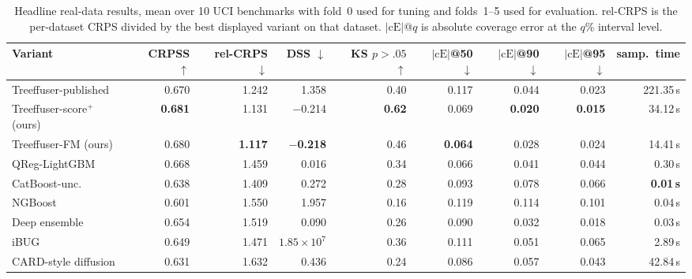 \documentclass{tpm2026}
\begin{document}
\begin{table}[!t]
  \centering
  \caption{Headline real-data results, mean over 10 UCI benchmarks with fold~0 used for tuning and folds~1--5 used for evaluation. rel-CRPS is the per-dataset CRPS divided by the best displayed variant on that dataset. $|\text{cE}|$@$q$ is absolute coverage error at the $q$\% interval level.}\label{tab:headline}
  \scriptsize
  \begin{tabular}{lrrrrrrrr}
    \toprule
    Variant & CRPSS $\uparrow$ & rel-CRPS $\downarrow$ & DSS $\downarrow$ & KS $p{>}.05$ $\uparrow$ & $|\text{cE}|$@50 $\downarrow$ & $|\text{cE}|$@90 $\downarrow$ & $|\text{cE}|$@95 $\downarrow$ & samp.\ time \\
    \midrule
    Treeffuser-published & 0.670 & 1.242 & 1.358 & 0.40 & 0.117 & 0.044 & 0.023 & 221.35\,s \\
    Treeffuser-score$^+$ (ours) & \textbf{0.681} & 1.131 & $-$0.214 & \textbf{0.62} & 0.069 & \textbf{0.020} & \textbf{0.015} & 34.12\,s \\
    Treeffuser-FM (ours) & 0.680 & \textbf{1.117} & \textbf{$-$0.218} & 0.46 & \textbf{0.064} & 0.028 & 0.024 & 14.41\,s \\
    \midrule
    QReg-LightGBM & 0.668 & 1.459 & 0.016 & 0.34 & 0.066 & 0.041 & 0.044 & 0.30\,s \\
    CatBoost-unc. & 0.638 & 1.409 & 0.272 & 0.28 & 0.093 & 0.078 & 0.066 & \textbf{0.01\,s} \\
    NGBoost & 0.601 & 1.550 & 1.957 & 0.16 & 0.119 & 0.114 & 0.101 & 0.04\,s \\
    Deep ensemble & 0.654 & 1.519 & 0.090 & 0.26 & 0.090 & 0.032 & 0.018 & 0.03\,s \\
    iBUG & 0.649 & 1.471 & $1.85{\times}10^7$ & 0.36 & 0.111 & 0.051 & 0.065 & 2.89\,s \\
    CARD-style diffusion & 0.631 & 1.632 & 0.436 & 0.24 & 0.086 & 0.057 & 0.043 & 42.84\,s \\
    \bottomrule
  \end{tabular}
\end{table}
\end{document}
